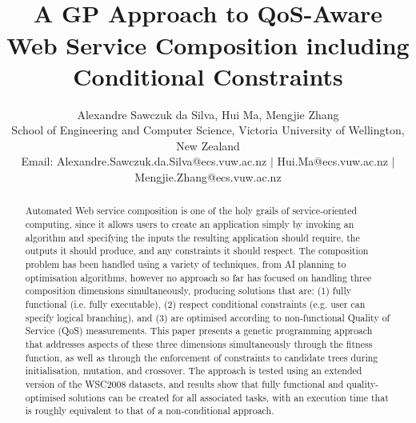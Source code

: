 \documentclass[conference]{IEEEtran}
\begin{document}
\setlength{\abovecaptionskip}{1ex}
\setlength{\belowcaptionskip}{1ex}
\setlength{\floatsep}{1ex}
\setlength{\textfloatsep}{1ex}
\setlength{\parskip}{0.5ex}

\title{\ \\ \LARGE\bf A GP Approach to QoS-Aware Web Service Composition including Conditional Constraints \vspace{-0.5cm}}
\vspace{-8cm}
\author{Alexandre Sawczuk da Silva, Hui Ma, Mengjie Zhang\\ \small School of
Engineering and Computer Science, Victoria University of Wellington, New Zealand\\
Email: Alexandre.Sawczuk.da.Silva@ecs.vuw.ac.nz $|$ Hui.Ma@ecs.vuw.ac.nz $|$
Mengjie.Zhang@ecs.vuw.ac.nz \vspace{0.5cm}}

\maketitle

\begin{abstract}
Automated Web service composition is one of the holy grails of service-oriented computing, since it allows users to create an application simply by invoking
an algorithm and specifying the inputs the resulting application should require, the outputs it should produce, and any constraints it should respect. The composition
problem has been handled using a variety of techniques, from AI planning to optimisation algorithms, however no approach so far has focused on handling three composition dimensions
simultaneously, producing solutions that are: (1) fully functional (i.e. fully executable), (2) respect conditional constraints (e.g. user can specify logical branching), and (3) are optimised according to non-functional Quality of Service (QoS) measurements. This paper presents a genetic programming approach that addresses aspects of these three
dimensions simultaneously through the fitness function, as well as through the enforcement of constraints to candidate trees during initialisation, mutation, and crossover. The approach
is tested using an extended version of the WSC2008 datasets, and results show that fully functional and quality-optimised solutions can be created for all associated tasks, with an execution time that is roughly equivalent to that of a non-conditional approach.


\end{abstract}
\end{document}
